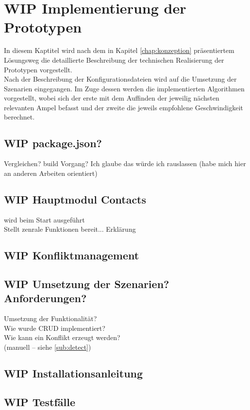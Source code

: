 \chapter{\label{chap:implementierung}WIP Implementierung der Prototypen}
In diesem Kaptitel wird nach dem in Kapitel \ref{chap:konzeption} präsentiertem Lösungsweg die detaillierte Beschreibung der technischen Realisierung der Prototypen vorgestellt.\\
Nach der Beschreibung der Konfigurationsdateien wird auf die Umsetzung der Szenarien eingegangen. Im Zuge dessen werden die implementierten Algorithmen vorgestellt, wobei sich der erste mit dem Auffinden der jeweilig nächsten relevanten Ampel befasst und der zweite die jeweils empfohlene Geschwindigkeit berechnet.
%
%
%
\section{WIP package.json?}
Vergleichen? build Vorgang? Ich glaube das würde ich rauslassen (habe mich hier an anderen Arbeiten orientiert)
%
%
%
\section{WIP Hauptmodul Contacts}
wird beim Start ausgeführt\\
Stellt zenrale Funktionen bereit... Erklärung\\
%
%
%
\section{WIP Konfliktmanagement}
%
%
%
\section{WIP Umsetzung der Szenarien? Anforderungen?}
Umsetzung der Funktionalität? \\
Wie wurde CRUD implementiert?\\
Wie kann ein Konflikt erzeugt werden?\\
(manuell -- siehe \ref{sub:detect})
%
%
\section{WIP Installationsanleitung}


%
%
\section{\label{sec:impl:test}WIP Testfälle}
